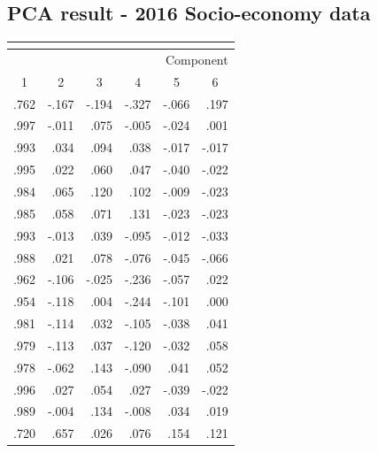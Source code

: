 \documentclass{mcmthesis}
\begin{document}
\begin{appendices}
\section{PCA result - 2016 Socio-economy data}
\begin{table}[htbp]
  \centering
    \begin{tabular}{|r|r|r|r|r|r|}
    \multicolumn{6}{c}{} \\
    \midrule
    \multicolumn{6}{|p{24em}|}{Component} \\
    \midrule
    \multicolumn{1}{|c|}{1} & \multicolumn{1}{c|}{2} & \multicolumn{1}{c|}{3} & \multicolumn{1}{c|}{4} & \multicolumn{1}{c|}{5} & \multicolumn{1}{c|}{6} \\
    \midrule
    .762  & -.167 & -.194 & -.327 & -.066 & .197 \\
    .997  & -.011 & .075  & -.005 & -.024 & .001 \\
    .993  & .034  & .094  & .038  & -.017 & -.017 \\
    .995  & .022  & .060  & .047  & -.040 & -.022 \\
    .984  & .065  & .120  & .102  & -.009 & -.023 \\
    .985  & .058  & .071  & .131  & -.023 & -.023 \\
    .993  & -.013 & .039  & -.095 & -.012 & -.033 \\
    .988  & .021  & .078  & -.076 & -.045 & -.066 \\
    .962  & -.106 & -.025 & -.236 & -.057 & .022 \\
    .954  & -.118 & .004  & -.244 & -.101 & .000 \\
    .981  & -.114 & .032  & -.105 & -.038 & .041 \\
    .979  & -.113 & .037  & -.120 & -.032 & .058 \\
    .978  & -.062 & .143  & -.090 & .041  & .052 \\
    .996  & .027  & .054  & .027  & -.039 & -.022 \\
    .989  & -.004 & .134  & -.008 & .034  & .019 \\
    .720  & .657  & .026  & .076  & .154  & .121 \\



    \end{tabular}%
  \label{tab:addlabel}%
\end{table}%
\begin{table}[htbp]
  \centering


\end{table}
\end{appendices}
\end{document}
